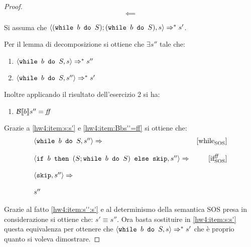 {\begin{proof}
$$\boxed{\impliedby}$$

Si assuma che $\confSs{(\wbS{b}{S}); (\wbS{b}{S})}{s} \Rar{*} s'$.


Per il lemma di decomposizione si ottiene che $\exists s''$ tale che:
\begin{enumerate}[label=(\Roman*)]
	\item $\confSs{\wbS{b}{S}}{s} \Rar{*} s''$
	\label{hw4:item:s:s'}
	\item $\confSs{\wbS{b}{S}}{s''} \Rar{*} s'$
	\label{hw4:item:s'':s'}
\end{enumerate}
Inoltre applicando il risultato dell'esercizio 2 si ha:
\begin{enumerate}[label=(\alph*)]
	\item $\B{b}'' = \semfalse$
	\label{hw4:item:Bbs''=ff}
\end{enumerate}
Grazie a \ref{hw4:item:s:s'} e \ref{hw4:item:Bbs''=ff} si ottiene che:
$$
\begin{array}{lr}
\confSs{\wbS{b}{S}}{s''} \Rar{}& \whileSOS\\
& \\
\confSs{\ifABC{b}{(S; \wbS{b}{S})}{\skipForFriends}}{s''} \Rar{}& \ifffSOS \\
 & \\
\confSs{\skipForFriends}{s''} \Rar{}& \\
& \\
s''
\end{array}
$$


Grazie al fatto \ref{hw4:item:s'':s'} e al determinismo della semantica SOS
presa in considerazione si ottiene che: $s' \equiv{ } s''$.
Ora basta sostituire in \ref{hw4:item:s:s'} questa equivalenza per ottenere
che $\confSs{\wbS{b}{S}}{s} \Rar{*} s'$ che è proprio quanto si voleva
dimostrare.
\end{proof}
}
